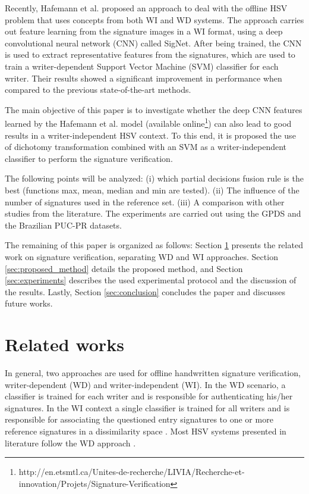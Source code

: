 \documentclass[conference]{IEEEtran}
\begin{document}
Recently, Hafemann et al. \cite{hafemann:17} proposed an approach to deal with the offline HSV problem that uses concepts from both WI and WD systems. The approach carries out feature learning from the signature images in a WI format, using a deep convolutional neural network (CNN) called SigNet. After being trained, the CNN is used to extract representative features from the signatures, which are used to train a writer-dependent Support Vector Machine (SVM) classifier for each writer. Their results showed a significant improvement in performance when compared to the previous state-of-the-art methods.


The main objective of this paper is to investigate whether the deep CNN features learned by the Hafemann et al. model \cite{hafemann:17} (available online\footnote{http://en.etsmtl.ca/Unites-de-recherche/LIVIA/Recherche-et-innovation/Projets/Signature-Verification}) can also lead to good results in a writer-independent HSV context. To this end, it is proposed the use of dichotomy transformation \cite{rivard:13} combined with an SVM as a writer-independent classifier to perform the signature verification. 


The following points will be analyzed: (i) which partial decisions fusion rule is the best (functions max, mean, median and min are tested). (ii) The influence of the number of signatures used in the reference set. (iii) A comparison  with other studies from the literature. The experiments are carried out using the GPDS and the Brazilian PUC-PR datasets.


The remaining of this paper is organized as follows: Section \ref{sec:related_works} presents the related work on signature verification, separating WD and WI approaches. Section \ref{sec:proposed_method} details the proposed method, and Section \ref{sec:experiments} describes the used experimental protocol and the discussion of the results. Lastly, Section \ref{sec:conclusion} concludes the paper and discusses future works.


\section{Related works}
\label{sec:related_works}


In general, two approaches are used for offline handwritten signature verification, writer-dependent (WD) and writer-independent (WI). In the WD scenario, a classifier is trained for each writer and is responsible for authenticating his/her signatures. In the WI context a single classifier is trained for all writers and is responsible for associating the questioned entry signatures to one or more reference signatures in a dissimilarity space \cite{hafemann:17}. Most HSV systems presented in literature follow the WD approach \cite{hafemann_review:17}.
\end{document}
